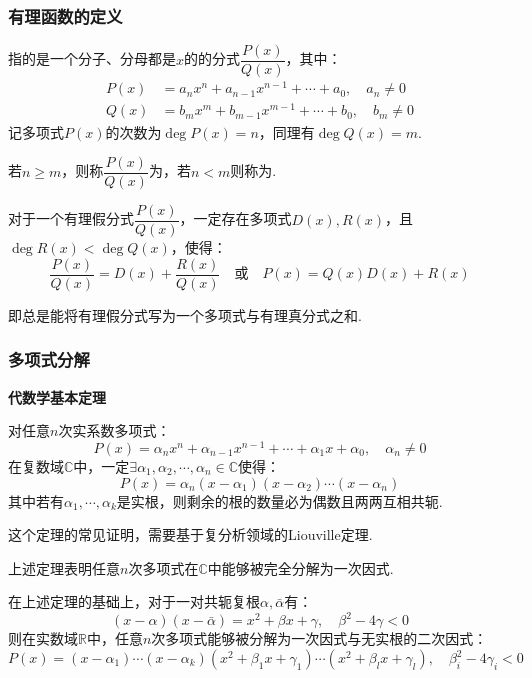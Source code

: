 \subsubsection{有理函数的定义}
\begin{definition}
    指的是一个分子、分母都是$x$的的分式$\dfrac{P(x)}{Q(x)}$，其中：
    \begin{align*}
        P(x) &= a_n x^n + a_{n-1} x^{n-1} + \cdots + a_0,\quad a_n \neq 0\\
        Q(x) &= b_m x^m + b_{m-1} x^{m-1} + \cdots + b_0,\quad b_m \neq 0
    \end{align*}
    记多项式$P(x)$的次数为$\deg P(x) = n$，同理有$\deg Q(x) = m$.

    若$n \geqslant m$，则称$\dfrac{P(x)}{Q(x)}$为，若$n < m$则称为.
\end{definition}

\begin{theorem}
    对于一个有理假分式$\dfrac{P(x)}{Q(x)}$，一定存在多项式$D(x),R(x)$，且$\deg R(x) < \deg Q(x)$，使得：
    \[\frac{P(x)}{Q(x)} = D(x) + \frac{R(x)}{Q(x)} \quad\text{或}\quad P(x) = Q(x)D(x) + R(x)\]
\end{theorem}

即总是能将有理假分式写为一个多项式与有理真分式之和.


\subsubsection{多项式分解}
\begin{theorem}
    \textbf{代数学基本定理}

    对任意$n$次实系数多项式：
    \[P(x) = \alpha_n x^n + \alpha_{n-1} x^{n-1} + \cdots + \alpha_1 x + \alpha_0,\quad \alpha_n \neq 0\]
    在复数域$\mathbb{C}$中，一定$\exists \alpha_1,\alpha_2,\cdots,\alpha_n \in \mathbb{C}$使得：
    \[P(x) = \alpha_n(x-\alpha_1)(x-\alpha_2)\cdots(x-\alpha_n)\]
    其中若有$\alpha_1,\cdots,\alpha_k$是实根，则剩余的根的数量必为偶数且两两互相共轭.
\end{theorem}

这个定理的常见证明，需要基于复分析领域的Liouville定理.

上述定理表明任意$n$次多项式在$\mathbb{C}$中能够被完全分解为一次因式.

在上述定理的基础上，对于一对共轭复根$\alpha,\bar{\alpha}$有：
\[(x-\alpha)(x-\bar{\alpha}) = x^2 + \beta x +\gamma,\quad \beta^2 - 4\gamma < 0\]
则在实数域$\mathbb{R}$中，任意$n$次多项式能够被分解为一次因式与无实根的二次因式：
\[P(x) = (x-\alpha_1)\cdots(x-\alpha_k)(x^2 + \beta_1 x + \gamma_1)\cdots(x^2 + \beta_l x + \gamma_l),\quad \beta_i^2 - 4\gamma_i < 0\]


